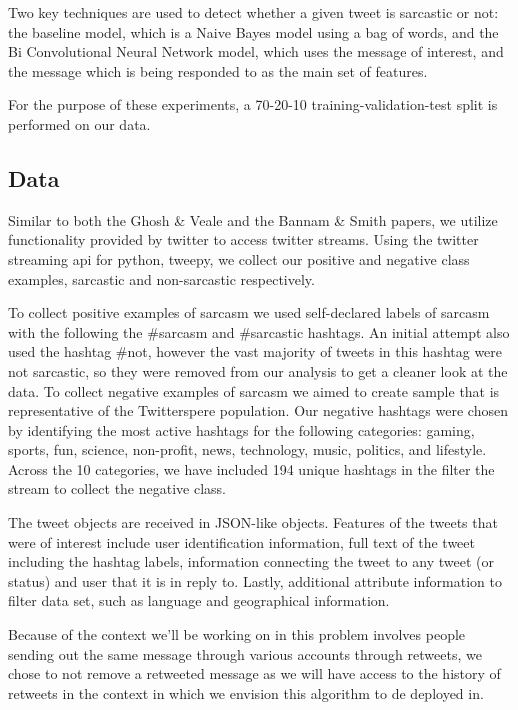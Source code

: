 \documentclass[11pt,a4paper]{article}
\begin{document}
Two key techniques are used to detect whether a given tweet is sarcastic or not: the baseline model, which is a Naive Bayes model using a bag of words, and the Bi Convolutional Neural Network model,  which uses the message of interest, and the message which is being responded to as the main set of features.

For the purpose of these experiments, a 70-20-10 training-validation-test split is performed on our data. 

\subsection{Data}
Similar to both the Ghosh \& Veale and the Bannam \& Smith papers, we utilize functionality provided by twitter to access twitter streams. Using the twitter streaming api for python, tweepy, we collect our positive and negative class examples, sarcastic and non-sarcastic respectively.  

To collect positive examples of sarcasm we used self-declared labels of sarcasm with the following the \#sarcasm and \#sarcastic hashtags.  An initial attempt also used the hashtag \#not, however the vast majority of tweets in this hashtag were not sarcastic, so they were removed from our analysis to get a cleaner look at the data. To collect negative examples of sarcasm we aimed to create sample that is representative of the Twitterspere population. Our negative hashtags were chosen by identifying the most active hashtags for the following categories:  gaming, sports, fun, science, non-profit, news, technology, music, politics, and lifestyle.  Across the 10 categories, we have included 194 unique hashtags in the filter the stream to collect the negative class.  

The tweet objects are received in JSON-like objects.  Features of the tweets that were of interest include user identification information, full text of the tweet including the hashtag labels, information connecting the tweet to any tweet (or status) and user that it is in reply to.  Lastly, additional attribute information to filter data set, such as language and geographical information. 

Because of the context we'll be working on in this problem involves people sending out the same message through various accounts through retweets, we chose to not remove a retweeted message as we will have access to the history of retweets in the context in which we envision this algorithm to de deployed in.
\end{document}
